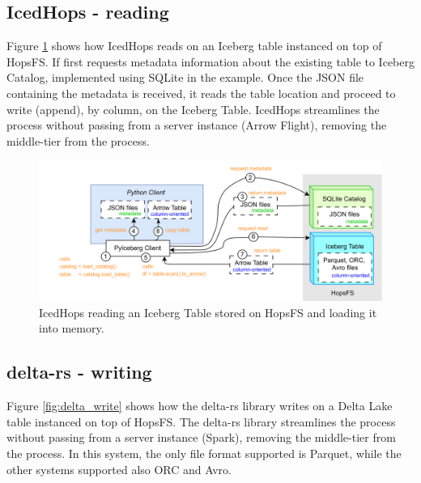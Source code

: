 \subsection{IcedHops - reading}
\label{subsec:back_sys_iceberg_read}

Figure \ref{fig:iceberg_read} shows how IcedHops reads on an Iceberg table instanced on top of \gls{HopsFS}. If first requests metadata information about the existing table to Iceberg Catalog, implemented using SQLite in the example. Once the JSON file containing the metadata is received, it reads the table location and proceed to write (append), by column, on the Iceberg Table. IcedHops streamlines the process without passing from a server instance (Arrow Flight), removing the middle-tier from the process.

\begin{figure}
    \begin{center}
      \includegraphics[width=\textwidth]{figures/2-background_and_related_work/iceberg_read.png}
    \end{center}
    \caption[IcedHops - read process]{IcedHops reading an Iceberg Table stored on \gls{HopsFS} and loading it into memory.}
    \label{fig:iceberg_read}
\end{figure}



\subsection{delta-rs - writing}
\label{subsec:back_sys_delta_write}

Figure \ref{fig:delta_write} shows how the delta-rs library writes on a Delta Lake table instanced on top of \gls{HopsFS}. The delta-rs library streamlines the process without passing from a server instance (Spark), removing the middle-tier from the process. In this system, the only file format supported is Parquet, while the other systems supported also ORC and Avro.

